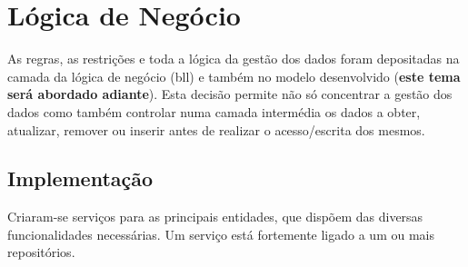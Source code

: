 %
%
\section{Lógica de Negócio}\label{sec34}

As regras, as restrições e toda a lógica da gestão dos dados foram depositadas na camada da lógica de negócio (\acrshort{bll}) e também no modelo desenvolvido (\textbf{este tema será abordado adiante}). Esta decisão permite não só concentrar a gestão dos dados como também controlar numa camada intermédia os dados a obter, atualizar, remover ou inserir antes de realizar o acesso/escrita dos mesmos. 

\subsection{Implementação}\label{subsec341}
 
 Criaram-se serviços para as principais entidades, que dispõem das diversas funcionalidades necessárias. Um serviço está fortemente ligado a um ou mais repositórios. 